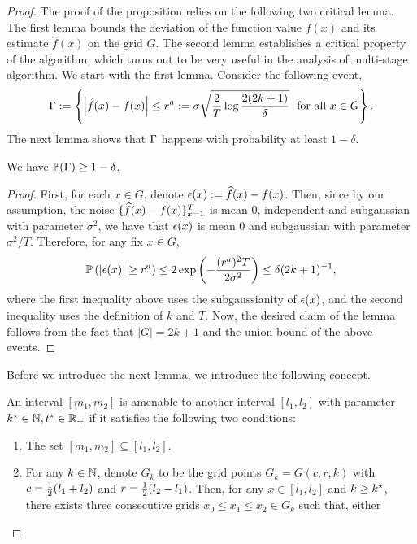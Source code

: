 \begin{proof}
The proof of the proposition relies on the following two critical lemma. The 
first lemma bounds the deviation of the function value $f(x)$ and its estimate 
$\hat{f}(x)$ on the grid $G$. The second lemma establishes a critical property 
of the algorithm, which turns out to be very useful in the analysis of multi-stage 
algorithm. We start with the first lemma. Consider the following event, 
\begin{equation*}
\Gamma := \left\{\left|\hat{f}(x) - f(x)\right| \leq r^a := \sigma \sqrt{\frac{2}{T} 
	\log \frac{2(2k+1)}{\delta}}~~\text{for all $x\in G$}\right\}.
\end{equation*}
The next lemma shows that $\Gamma$ happens with probability at least $1-\delta$. 
\begin{lemma}
We have $\mathbb{P}(\Gamma) \geq 1-\delta$. 
\end{lemma}
\begin{proof}
First, for each $x \in G$, denote $\epsilon(x) := \widehat{f}(x) - f(x)$.  Then, since 
by our assumption, the noise $\{\widehat{f}(x) - f(x)\}_{x=1}^{T}$ is mean $0$, independent 
and subgaussian with parameter $\sigma^2$, we have that $\epsilon(x)$ is mean $0$ 
and subgaussian with parameter $\sigma^2/T$. Therefore, for any fix $x\in G$, 
\begin{align*}
\mathbb{P}\left(|\epsilon(x)| \geq r^a \right) 
		\leq 2\exp\left(-\frac{(r^a)^2T}{2\sigma^2}\right) 
			\leq \delta (2k+1)^{-1}, 
\end{align*}
where the first inequality above uses the subgaussianity of $\epsilon(x)$, and 
the second inequality uses the definition of $k$ and $T$. 
Now, the desired claim of the lemma follows from the fact that 
$|G| = 2k+1$ and the union bound of the above events. 
\end{proof}
Before we introduce the next lemma, we introduce the following concept. 
\begin{definition}
An interval $[m_1, m_2]$ is amenable to another interval $[l_1, l_2]$ with 
parameter $k^\star\in \mathbb{N}, t^\star \in \mathbb{R}_+$ if it satisfies the following two conditions: 
\begin{enumerate}
\item The set $[m_1, m_2] \subseteq [l_1, l_2]$.
\item For any $k \in \mathbb{N}$, denote $G_k$ to be the grid points 
	$G_k = G(c, r, k)$ with $c = \frac{1}{2}(l_1 + l_2)$ and $r = \frac{1}{2}(l_2 - l_1)$. 
	Then, for any $x \in [l_1, l_2]$ and $k \geq k^\star$, there exists three 
	consecutive grids $x_0 \leq x_1 \leq x_2 \in G_k$ such that, either 

\end{enumerate}
\end{definition}
\end{proof}
